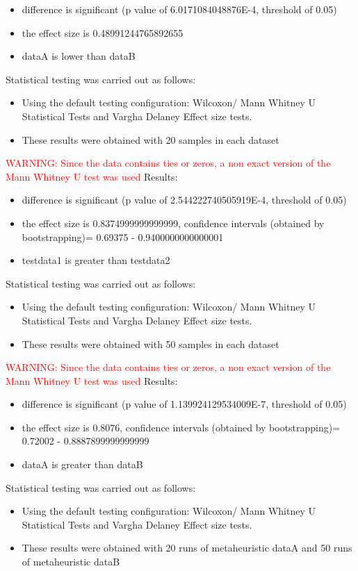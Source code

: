 \documentclass[]{article}
\begin{document}
\begin{itemize}
\item{difference is significant (p value of 6.0171084048876E-4, threshold of 0.05)}
\item{the effect size is 0.48991244765892655}
\item{dataA is lower than dataB}
\end{itemize}Statistical testing was carried out as follows: \begin{itemize}
\item{Using the default testing configuration: Wilcoxon/ Mann Whitney U Statistical Tests and Vargha Delaney Effect size tests.}
\item{These results were obtained with 20 samples in each dataset}
\end{itemize}
\textcolor{Red}{WARNING: Since the data contains ties or zeros, a non exact version of the Mann Whitney U test was used
}
Results:
\begin{itemize}
\item{difference is significant (p value of 2.544222740505919E-4, threshold of 0.05)}
\item{the effect size is 0.8374999999999999, confidence intervals (obtained by bootstrapping)= 0.69375 - 0.9400000000000001}
\item{testdata1 is greater than testdata2}
\end{itemize}Statistical testing was carried out as follows: \begin{itemize}
\item{Using the default testing configuration: Wilcoxon/ Mann Whitney U Statistical Tests and Vargha Delaney Effect size tests.}
\item{These results were obtained with 50 samples in each dataset}
\end{itemize}
\textcolor{Red}{WARNING: Since the data contains ties or zeros, a non exact version of the Mann Whitney U test was used
}
Results:
\begin{itemize}
\item{difference is significant (p value of 1.139924129534009E-7, threshold of 0.05)}
\item{the effect size is 0.8076, confidence intervals (obtained by bootstrapping)= 0.72002 - 0.8887899999999999}
\item{dataA is greater than dataB}
\end{itemize}Statistical testing was carried out as follows: \begin{itemize}
\item{Using the default testing configuration: Wilcoxon/ Mann Whitney U Statistical Tests and Vargha Delaney Effect size tests.}
\item{These results were obtained with 20 runs of metaheuristic dataA and 50 runs of metaheuristic dataB}
\end{itemize}
\end{document}
